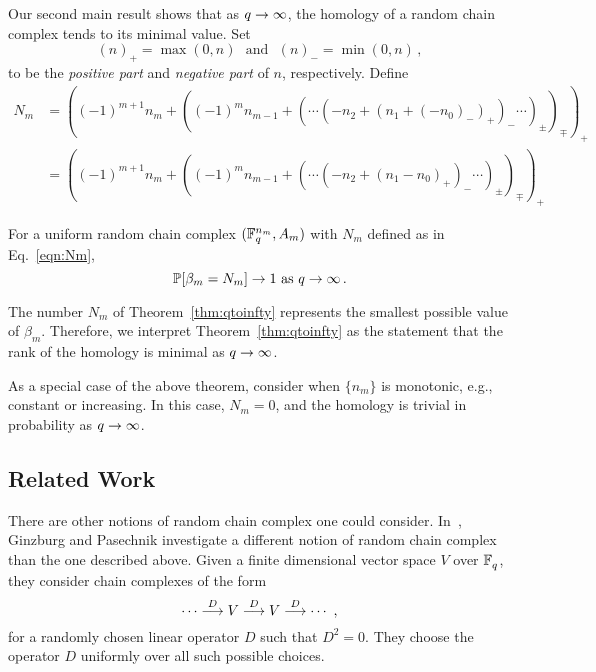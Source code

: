 Our second main result shows that as $q \rightarrow \infty$, the homology of a 
random chain complex tends to its minimal value. Set
\begin{equation*}
  (n)_+ = \max(0,n) \, \, \mbox{ and } \, \, (n)_- = \min(0,n) \, ,
\end{equation*}
to be the {\em positive part} and {\em negative part} of $n$, respectively.
Define
\begin{equation}
\begin{aligned}
  N_m &= \left( (-1)^{m+1}n_m + \left( (-1)^{m}n_{m-1} + \left( \cdots(-n_2 + (n_1+ (-n_0)_-)_+ )_- \cdots \right)_{\pm} \right)_{\mp} \right)_+ \\
    &=\left( (-1)^{m+1}n_m + \left( (-1)^m n_{m-1} + \left( \cdots(-n_2 + (n_1 -n_0)_+ )_- \cdots \right)_{\pm} \right)_{\mp} \right)_+
\end{aligned}
  \label{eqn:Nm}
\end{equation}


\begin{bigthm}
  \label{thm:qtoinfty}
  For a uniform random chain complex $(\mathbb{F}_q^{n_m},A_m)$ with $N_m$ defined as in Eq.~\eqref{eqn:Nm},
  \[
    \mathbb{P}[\beta_m = N_m] \rightarrow 1 
    \mbox{ as } q \rightarrow \infty  \, .
  \]
\end{bigthm}

\begin{remark}
  \label{rem:smallest}
  The number $N_m$ of Theorem~\ref{thm:qtoinfty} represents the smallest
  possible value of $\beta_m$. Therefore, we interpret Theorem~\ref{thm:qtoinfty}
  as the statement that the rank of the homology is minimal as 
  $q \rightarrow \infty$.
\end{remark}

\begin{remark}
  \label{rem:monotone}
  As a special case of the above theorem, consider when $\{n_m\}$
  is monotonic, e.g., constant or increasing. In this case, 
  $N_m = 0$, and the homology is trivial in probability as $q \rightarrow \infty$.
\end{remark}

\subsection*{Related Work} There are other notions of random chain complex
one could consider. In~\cite{ginzburg2017random}, Ginzburg and Pasechnik investigate
a different notion of random chain complex than the one described above.
Given a finite dimensional vector space $V$ over $\mathbb{F}_q^{}$, they consider chain
complexes of the form
\[
  \cdots \stackrel{D}{\longrightarrow} V \stackrel{D}{\longrightarrow} V \stackrel{D}{\longrightarrow} \cdots \, \, ,
\]
for a randomly chosen linear operator $D$ such that $D^2 = 0$. They choose the 
operator $D$ uniformly over all such possible choices. 

